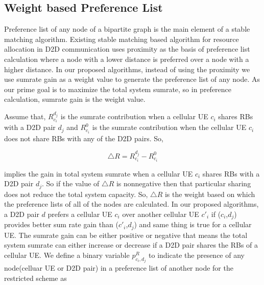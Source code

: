 \documentclass[times]{dacauth}
\begin{document}


\subsection{Weight based Preference List} \label{preference list}


\noindent
Preference list of any node of a bipartite graph is the main element of a stable matching algorithm. Existing stable matching based algorithm \cite{dara} for resource allocation in D2D communication uses proximity as the basis of preference list calculation where a node with a lower distance is preferred over a node with a higher distance. In our proposed algorithms, instead of using the proximity we use sumrate gain as a  weight value to generate the preference list of any node. As our prime goal is to maximize the total system sumrate, so in preference calculation, sumrate gain is the weight value. 

\smallskip

\noindent
Assume that, $R_{c_i}^{d_j}$ is the sumrate contribution when a cellular UE $c_i$ shares RBs with a D2D pair $d_j$ and $R_{c_i}^{0}$ is the sumrate contribution when the cellular UE $c_i$ does not share RBs with any of the D2D pairs. So,



\begin{equation}
	\triangle R = R_{c_i}^{d_j}-R_{c_i}^{0} \label{eqn:sum rate increment}
\end{equation}  
       
    

\noindent
implies the gain in total system sumrate when a cellular UE $c_i$ shares RBs with a D2D pair $d_j$. So if the value of $\triangle R$ is nonnegative then that particular sharing does not reduce the total system capacity. So, $\triangle R$ is the weight based on which the preference lists of all of the nodes are calculated. In our proposed algorithms, a D2D pair $d$ prefers a cellular UE $c_i$ over another cellular UE $c'_i$ if ($c_i$,$d_j$) provides better sum rate gain than ($c'_i$,$d_j$) and same thing is true for a cellular UE. The sumrate gain can be either positive or negative that means the total system sumrate can either increase or decrease if a D2D pair shares the RBs of a cellular UE. We define a binary variable $p_{c_i,d_j}^{R}$ to indicate the presence of any node(celluar UE or D2D pair) in a preference list of another node for the restricted scheme as
\end{document}
